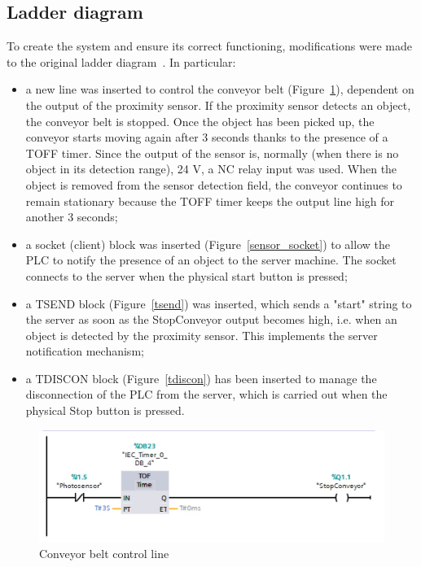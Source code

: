 \documentclass[a4paper,11pt]{report}
\theoremstyle{definition}
\theoremstyle{plain}
\begin{document}
        \subsection{Ladder diagram}
        To create the system and ensure its correct functioning, modifications were made to the original ladder diagram~\cite{ladder}. In particular:
        \begin{itemize}
            \item a new line was inserted to control the conveyor belt (Figure~\ref{conv_handle}), dependent on the output of the proximity sensor. If the proximity sensor detects an object, the conveyor belt is stopped. Once the object has been picked up, the conveyor starts moving again after 3 seconds thanks to the presence of a TOFF timer. Since the output of the sensor is, normally (when there is no object in its detection range), 24 V, a NC relay input was used. When the object is removed from the sensor detection field, the conveyor continues to remain stationary because the TOFF timer keeps the output line high for another 3 seconds;
            \item a socket (client) block was inserted (Figure~\ref{sensor_socket}) to allow the PLC to notify the presence of an object to the server machine. The socket connects to the server when the physical start button is pressed;
            \item a TSEND block (Figure~\ref{tsend}) was inserted, which sends a "start" string to the server as soon as the StopConveyor output becomes high, i.e. when an object is detected by the proximity sensor. This implements the server notification mechanism;
            \item a TDISCON block (Figure~\ref{tdiscon}) has been inserted to manage the disconnection of the PLC from the server, which is carried out when the physical Stop button is pressed.
        \end{itemize}

        \begin{figure}[H]
        \includegraphics[scale=0.3]{images/CONV_HANDLE.jpeg}
        \centering
        \caption{Conveyor belt control line}
        \label{conv_handle}
        \end{figure}
\end{document}

